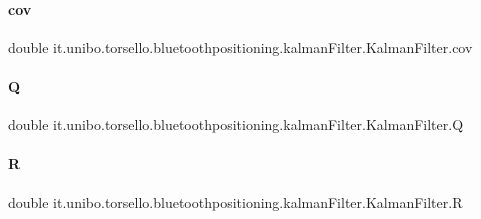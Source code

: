 \paragraph{\texorpdfstring{cov}{cov}}
{\footnotesize\ttfamily double it.\+unibo.\+torsello.\+bluetoothpositioning.\+kalman\+Filter.\+Kalman\+Filter.\+cov\hspace{0.3cm}{\ttfamily [private]}}

\hypertarget{classit_1_1unibo_1_1torsello_1_1bluetoothpositioning_1_1kalmanFilter_1_1KalmanFilter_a684136c1ebc53dab2d661e98e7485a0a_a684136c1ebc53dab2d661e98e7485a0a}{}\label{classit_1_1unibo_1_1torsello_1_1bluetoothpositioning_1_1kalmanFilter_1_1KalmanFilter_a684136c1ebc53dab2d661e98e7485a0a_a684136c1ebc53dab2d661e98e7485a0a} 
\paragraph{\texorpdfstring{Q}{Q}}
{\footnotesize\ttfamily double it.\+unibo.\+torsello.\+bluetoothpositioning.\+kalman\+Filter.\+Kalman\+Filter.\+Q\hspace{0.3cm}{\ttfamily [private]}}

\hypertarget{classit_1_1unibo_1_1torsello_1_1bluetoothpositioning_1_1kalmanFilter_1_1KalmanFilter_ad9b73500bbbee6969b5cfbe1a6e7a5ab_ad9b73500bbbee6969b5cfbe1a6e7a5ab}{}\label{classit_1_1unibo_1_1torsello_1_1bluetoothpositioning_1_1kalmanFilter_1_1KalmanFilter_ad9b73500bbbee6969b5cfbe1a6e7a5ab_ad9b73500bbbee6969b5cfbe1a6e7a5ab} 
\paragraph{\texorpdfstring{R}{R}}
{\footnotesize\ttfamily double it.\+unibo.\+torsello.\+bluetoothpositioning.\+kalman\+Filter.\+Kalman\+Filter.\+R\hspace{0.3cm}{\ttfamily [private]}}


